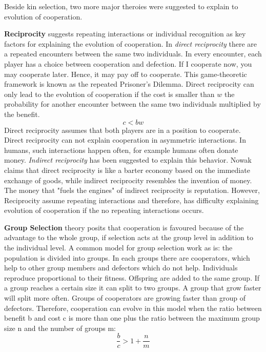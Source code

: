 \documentclass[12pt]{extarticle}
\begin{document}
Beside kin selection, two more major theroies were suggested to explain to evolution of cooperation.

\textbf{Reciprocity} suggests repeating interactions or individual recognition as key factors for explaining the evolution of cooperation. 
In \textit{direct reciprocity} there are a repeated encounters between the same two individuals. In every encounter, each player has a choice between cooperation and defection. If I cooperate now, you may cooperate later. Hence, it may pay off to cooperate.
This game-theoretic framework is known as the repeated Prisoner's Dilemma. 
Direct reciprocity can only lead to the evolution of cooperation if the cost is smaller than $w$ the probability for another encounter between the same two individuals multiplied by the benefit. 
\begin{equation} \label{reciprocity}
c<bw
\end{equation}
Direct reciprocity assumes that both players are in a position to cooperate. Direct reciprocity can not explain cooperation in asymmetric interactions. In humans, such interactions happen often, for example humans often donate money. 
\textit{Indirect reciprocity} has been suggested to explain this behavior. 
Nowak \cite{nowak2006five} claims that direct reciprocity is like a barter economy based on the immediate exchange of goods, while indirect reciprocity resembles the invention of money. The money that "fuels the engines" of indirect reciprocity is reputation. 
However, Reciprocity assume repeating interactions and therefore, has difficulty explaining evolution of cooperation if the no repeating interactions occurs. 

\textbf{Group Selection} theory posits that cooperation is favoured because of the advantage to the whole group, if selection acts at the group level in addition to the individual level. A common model for group selection work as is: the population is divided into groups. In each groups there are cooperators, which help to other group members and defectors which do not help. 
Individuals reproduce proportional to their fitness. Offspring are added to the same group.
If a group reaches a certain size it can split to two groups. A group that grow faster will split more often. Groups of cooperators are growing faster than group of defectors.
Therefore, cooperation can evolve in this model when the ratio between benefit b and cost c is more than one plus the ratio between the maximum group size n and the number of groups m:
\begin{equation} \label{groupselection}
\frac{b}{c}>1+\frac{n}{m}
\end{equation}
\end{document}
